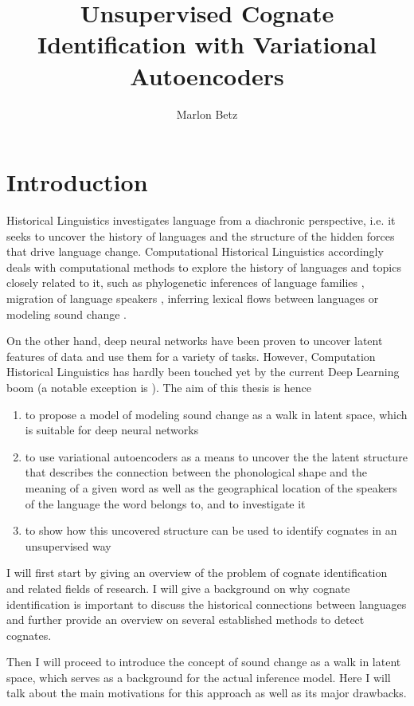 \documentclass[8pt]{article}
\title{Unsupervised Cognate Identification with Variational Autoencoders}
\author{Marlon Betz}
\begin{document}
\maketitle
\newpage
\tableofcontents
\section{Introduction}

Historical Linguistics investigates language from a diachronic perspective, i.e. it seeks to uncover the history of languages and the structure of the hidden forces that drive language change.  Computational Historical Linguistics accordingly deals with computational methods to explore the history of languages and topics closely related to it, such as phylogenetic inferences of language families \cite{bouckaert2012mapping}, migration of language speakers \cite{gray2009language}, inferring lexical flows between languages \cite{dellert2015uralic} or modeling sound change \cite{bouchard2013automated}.  

On the other hand, deep neural networks have been proven to uncover latent features of data and use them for a variety of tasks. However, Computation Historical Linguistics has hardly been touched yet by the current Deep Learning boom (a notable exception is \cite{rama2016siamese}). 
The aim of this thesis is hence 
\begin{enumerate}
\item to propose a model of modeling sound change as a walk in latent space, which is suitable for deep neural networks
\item to use variational autoencoders as a means to uncover the the latent structure that describes the connection between the phonological shape and  the meaning of a given word as well as the geographical location of the speakers of the language the word belongs to, and to investigate it
\item to show how this uncovered structure can be used to identify cognates in an unsupervised way
\end{enumerate}

I will first start by giving an overview of the problem of cognate identification and related fields of research. I will give a background on why cognate identification is important to discuss the historical connections between languages and further provide an overview on several established methods to detect cognates.  

Then I will proceed to introduce the concept of sound change as a walk in latent space, which serves as a background for the actual inference model. Here I will talk about the main motivations for this approach as well as its major drawbacks. 
\end{document}
